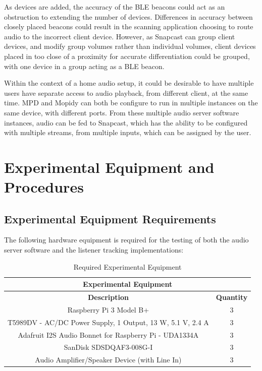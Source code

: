 \documentclass[11pt,a4paper,headinclude=false,footinclude=false]{scrreprt}
\begin{document}
As devices are added, the accuracy of the BLE beacons could act as an
obstruction to extending the number of devices. Differences in accuracy
between closely placed beacons could result in the scanning application
choosing to route audio to the incorrect client device. However, as
Snapcast can group client devices, and modify group volumes rather than
individual volumes, client devices placed in too close of a proximity
for accurate differentiation could be grouped, with one device in a
group acting as a BLE beacon.

Within the context of a home audio setup, it could be desirable to have
multiple users have separate access to audio playback, from different
client, at the same time. MPD and Mopidy can both be configure to run in
multiple instances on the same device, with different ports. From these
multiple audio server software instances, audio can be fed to Snapcast,
which has the ability to be configured with multiple streams, from
multiple inputs, which can be assigned by the user\cite{snapcastZones}.

\chapter{Experimental Equipment and
Procedures}\label{experimental-equipment-and-procedures}

\section{Experimental Equipment
Requirements}\label{experimental-equipment-requirements}

The following hardware equipment is required for the testing of both the
audio server software and the listener tracking implementations:

\begin{table}[H]
\centering
    \begin{tabular}{||c|c||}
    \hline
    \multicolumn{2}{|c|}{\textbf{Experimental Equipment}} \\
    \hline\hline
    \textbf{Description} & \textbf{Quantity} \\
    \hline\hline
    Raspberry Pi 3 Model B+ & 3 \\
    \hline
    T5989DV - AC/DC Power Supply, 1 Output, 13 W, 5.1 V, 2.4 A & 3 \\
    \hline
    Adafruit I2S Audio Bonnet for Raspberry Pi - UDA1334A & 3 \\
    \hline
    SanDisk SDSDQAF3-008G-I & 3 \\
    \hline
    Audio Amplifier/Speaker Device (with Line In) & 3 \\
    \hline
    \end{tabular}
    \caption{Required Experimental Equipment}
    \label{ExperimentalEquip}
\end{table}
\end{document}
